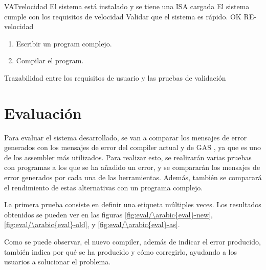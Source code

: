 \begin{testCase}{VAT}{velocidad}
    {El sistema está instalado y se tiene una \gls{ISA} cargada} %
    {El sistema cumple con los requisitos de velocidad} %
    {Validar que el sistema es rápido.} %
    {OK} %
    {RE-velocidad} %
    \begin{enumerate}[leftmargin=*, topsep=0pt, noitemsep] %
        \item Escribir un \gls{program} complejo.
        \item Compilar el \gls{program}.
    \end{enumerate}
\end{testCase}

\begin{landscape}
        {Trazabilidad entre los requisitos de usuario y las pruebas de validación}
\end{landscape}

\FloatBarrier

\section{Evaluación}\label{sec:evaluation}

\setcounter{eval}{1}

\newcommand{\evalres}{
    \svgfigurehere[0.7]{eval/\arabic{eval}-new}{Evaluación \arabic{eval} - Compilador nuevo}
    \svgfigurehere[0.7]{eval/\arabic{eval}-old}{Evaluación \arabic{eval} - Compilador actual}
    \svgfigurehere[0.7]{eval/\arabic{eval}-as}{Evaluación \arabic{eval} - GAS}
    \stepcounter{eval}
}

\newcommand{\evalresref}{
    Los resultados obtenidos se pueden ver en las figuras
    \ref{fig:eval/\arabic{eval}-new}, \ref{fig:eval/\arabic{eval}-old},
    y \ref{fig:eval/\arabic{eval}-as}.
}

Para evaluar el sistema desarrollado, se van a comparar los mensajes de error
generados con los mensajes de error del \gls{compiler} actual y de GAS
\parencite{GNUas}, ya que es uno de los \gls{assembler} más utilizados. Para
realizar esto, se realizarán varias pruebas con programas a los que se ha
añadido un error, y se compararán los mensajes de error generados por cada una
de las herramientas. Además, también se comparará el rendimiento de estas
alternativas con un programa complejo.

La primera prueba consiste en definir una etiqueta múltiples veces. \evalresref
Como se puede observar, el nuevo \gls{compiler}, además de indicar el error
producido, también indica por qué se ha producido y cómo corregirlo, ayudando a
los usuarios a solucionar el problema.

